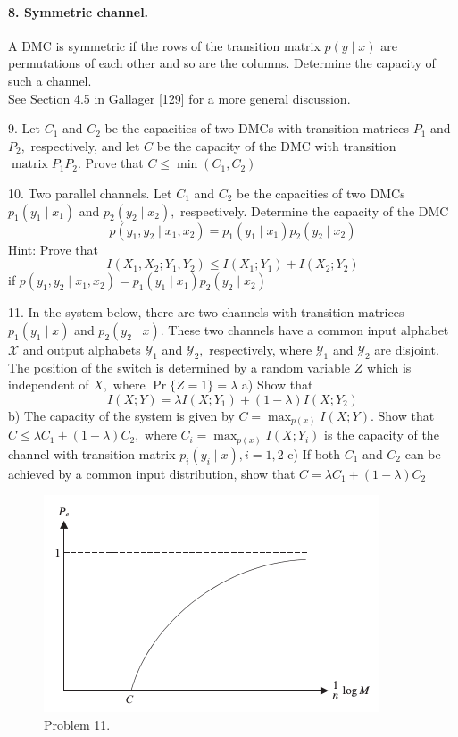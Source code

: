 \documentclass[8pt]{article}
\begin{document}
\begin{tcolorbox}
\paragraph{8. Symmetric channel.} A DMC is symmetric if the rows of the transition matrix $p(y \mid x)$ are permutations of each other and so are the columns. Determine the capacity of such a channel. \\
See Section 4.5 in Gallager [129] for a more general discussion.
\end{tcolorbox}

\begin{tcolorbox}
9. Let $C_{1}$ and $C_{2}$ be the capacities of two DMCs with transition matrices $P_{1}$ and $P_{2},$ respectively, and let $C$ be the capacity of the DMC with transition $\operatorname{matrix} P_{1} P_{2} .$ Prove that $C \leq \min \left(C_{1}, C_{2}\right)$
\end{tcolorbox}

\begin{tcolorbox}
10. Two parallel channels. Let $C_{1}$ and $C_{2}$ be the capacities of two DMCs $p_{1}\left(y_{1} \mid x_{1}\right)$ and $p_{2}\left(y_{2} \mid x_{2}\right),$ respectively. Determine the capacity of the DMC
$$
p\left(y_{1}, y_{2} \mid x_{1}, x_{2}\right)=p_{1}\left(y_{1} \mid x_{1}\right) p_{2}\left(y_{2} \mid x_{2}\right)
$$
Hint: Prove that
$$
I\left(X_{1}, X_{2} ; Y_{1}, Y_{2}\right) \leq I\left(X_{1} ; Y_{1}\right)+I\left(X_{2} ; Y_{2}\right)
$$
if $p\left(y_{1}, y_{2} \mid x_{1}, x_{2}\right)=p_{1}\left(y_{1} \mid x_{1}\right) p_{2}\left(y_{2} \mid x_{2}\right)$
\end{tcolorbox}

\begin{tcolorbox}
11. In the system below, there are two channels with transition matrices $p_{1}\left(y_{1} \mid x\right)$ and $p_{2}\left(y_{2} \mid x\right) .$ These two channels have a common input alphabet $\mathcal{X}$ and output alphabets $\mathcal{Y}_{1}$ and $\mathcal{Y}_{2},$ respectively, where $\mathcal{Y}_{1}$ and $\mathcal{Y}_{2}$ are disjoint. The position of the switch is determined by a random variable $Z$ which is independent of $X,$ where $\operatorname{Pr}\{Z=1\}=\lambda$
a) Show that
$$
I(X ; Y)=\lambda I\left(X ; Y_{1}\right)+(1-\lambda) I\left(X ; Y_{2}\right)
$$
b) The capacity of the system is given by $C=\max _{p(x)} I(X ; Y)$. Show that $C \leq \lambda C_{1}+(1-\lambda) C_{2},$ where $C_{i}=\max _{p(x)} I\left(X ; Y_{i}\right)$ is the capacity
of the channel with transition matrix $p_{i}\left(y_{i} \mid x\right), i=1,2$
c) If both $C_{1}$ and $C_{2}$ can be achieved by a common input distribution, show that $C=\lambda C_{1}+(1-\lambda) C_{2}$
\end{tcolorbox}
\begin{figure}[!h]
	\centering
	\includegraphics[width=0.3\linewidth]{imgs/exp7_11.png}
	\caption{Problem 11.}
\end{figure}
\end{document}
